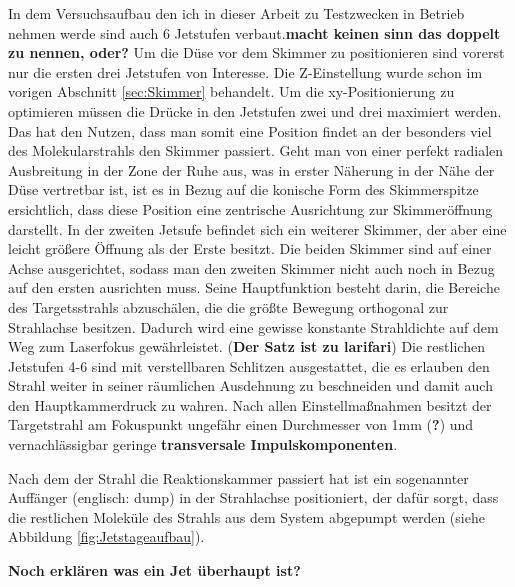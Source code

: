 In dem Versuchsaufbau den ich in dieser Arbeit zu Testzwecken in Betrieb nehmen werde sind auch 6 Jetstufen verbaut.\textbf{macht keinen sinn das doppelt zu nennen, oder?}
Um die Düse vor dem Skimmer zu positionieren sind vorerst nur die ersten drei Jetstufen von Interesse. Die Z-Einstellung wurde schon im vorigen Abschnitt \ref{sec:Skimmer} behandelt. Um die xy-Positionierung zu optimieren müssen die Drücke in den Jetstufen zwei und drei maximiert werden. Das hat den Nutzen, dass man somit eine Position findet an der besonders viel des Molekularstrahls den Skimmer passiert. Geht man von einer perfekt radialen Ausbreitung in der Zone der Ruhe aus, was in erster Näherung in der Nähe der Düse vertretbar ist, ist es in Bezug auf die konische Form des Skimmerspitze ersichtlich, dass diese Position eine zentrische Ausrichtung zur Skimmeröffnung darstellt. 
In der zweiten Jetsufe befindet sich ein weiterer Skimmer, der aber eine leicht größere Öffnung als der Erste besitzt. Die beiden Skimmer sind auf einer Achse ausgerichtet, sodass man den zweiten Skimmer nicht auch noch in Bezug auf den ersten ausrichten muss. Seine Hauptfunktion besteht darin, die Bereiche des Targetsstrahls abzuschälen, die die größte Bewegung orthogonal zur Strahlachse besitzen. Dadurch wird eine gewisse konstante Strahldichte auf dem Weg zum Laserfokus gewährleistet. (\textbf{Der Satz ist zu larifari}) 
Die restlichen Jetstufen 4-6 sind mit verstellbaren Schlitzen ausgestattet, die es erlauben den Strahl weiter in seiner räumlichen Ausdehnung zu beschneiden und damit auch den Hauptkammerdruck zu wahren. Nach allen Einstellmaßnahmen besitzt der Targetstrahl am Fokuspunkt ungefähr einen Durchmesser von 1mm (\textbf{?}) und vernachlässigbar geringe \textbf{transversale Impulskomponenten}.

Nach dem der Strahl die Reaktionskammer passiert hat ist ein sogenannter Auffänger (englisch: dump) in der Strahlachse positioniert, der dafür sorgt, dass die restlichen Moleküle des Strahls aus dem System abgepumpt werden (siehe Abbildung \ref{fig:Jetstageaufbau}).

\textbf{Noch erklären was ein Jet überhaupt ist?}
%
%
%
%
%
%
